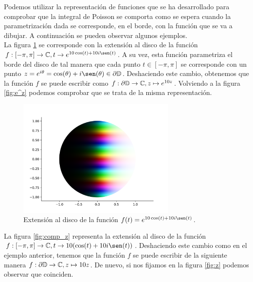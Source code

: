 Podemos utilizar la representación de funciones que se ha desarrollado para comprobar que la integral de Poisson se comporta como se espera cuando la parametrización dada se corresponde, en el borde, con la función que se va a dibujar. A continuación se pueden observar algunos ejemplos. \\

La figura \ref{fig:comp_e^z} se corresponde con la extensión al disco de la función $f : [-\pi, \pi] \to \complex, t \to e^{10 \cos(t)+10i \sen(t)}$. A su vez, esta función parametriza el borde del disco de tal manera que cada punto $t \in [-\pi, \pi]$ se corresponde con un punto $z = e^{i \theta} = \cos(\theta) + i \sen(\theta) \in \partial \disk$. Deshaciendo este cambio, obtenemos que la función $f$ se puede escribir como $f: \partial \mathbb{D} \to \mathbb{C}, z \mapsto e^{10z}$. Volviendo a la figura \ref{fig:e^z} podemos comprobar que se trata de la misma representación. \\

\begin{figure}[!htbp]
    \centering
    \includegraphics[width=0.7\textwidth]{../Aplicacion/e^(10cos(t)+10isen(t)).png}
    \caption{Extensión al disco de la función $f(t) = e^{10 \cos(t)+10i \sen(t)}$.}
    \label{fig:comp_e^z}
\end{figure}

La figura \ref{fig:comp_z} representa la extensión al disco de la función $f: [-\pi, \pi] \to \complex, t \to 10(\cos(t)+10i \sen(t))$. Deshaciendo este cambio como en el ejemplo anterior, tenemos que la función $f$ se puede escribir de la siguiente manera $f: \partial \mathbb{D} \to \mathbb{C}, z \mapsto 10z$. De nuevo, si nos fijamos en la figura \ref{fig:z} podemos observar que coinciden. \\

